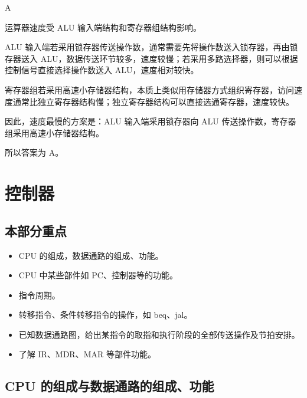\begin{answer}
A
\end{answer}

\begin{analysisenv}
运算器速度受 ALU 输入端结构和寄存器组结构影响。

ALU 输入端若采用锁存器传送操作数，通常需要先将操作数送入锁存器，再由锁存器送入 ALU，数据传送环节较多，速度较慢；若采用多路选择器，则可以根据控制信号直接选择操作数送入 ALU，速度相对较快。

寄存器组若采用高速小存储器结构，本质上类似用存储器方式组织寄存器，访问速度通常比独立寄存器结构慢；独立寄存器结构可以直接选通寄存器，速度较快。

因此，速度最慢的方案是：ALU 输入端采用锁存器向 ALU 传送操作数，寄存器组采用高速小存储器结构。

所以答案为 A。
\end{analysisenv}
\newpage

\section{控制器}

\subsection*{本部分重点}
\begin{itemize}
    \item CPU 的组成，数据通路的组成、功能。
    \item CPU 中某些部件如 PC、控制器等的功能。
    \item 指令周期。
    \item 转移指令、条件转移指令的操作，如 beq、jal。
    \item 已知数据通路图，给出某指令的取指和执行阶段的全部传送操作及节拍安排。
    \item 了解 IR、MDR、MAR 等部件功能。
\end{itemize}

\subsection{CPU 的组成与数据通路的组成、功能}

